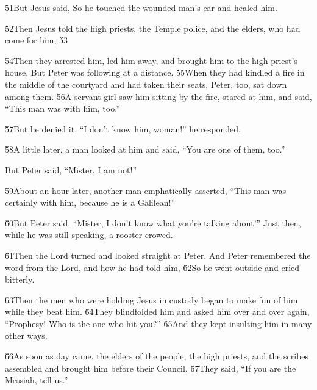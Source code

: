 \v{51}But Jesus said,  So he touched the wounded man's ear and healed him.

\v{52}Then Jesus told the high priests, the Temple police, and the elders, who had come for him,  \v{53}

\v{54}Then they arrested him, led him away, and brought him to the high priest's house. But Peter was following at a distance. \v{55}When they had kindled a fire in the middle of the courtyard and had taken their seats, Peter, too, sat down among them. \v{56}A servant girl saw him sitting by the fire, stared at him, and said, ``This man was with him, too.''

\v{57}But he denied it, ``I don't know him, woman!'' he responded.

\v{58}A little later, a man looked at him and said, ``You are one of them, too.''

But Peter said, ``Mister, I am not!''

\v{59}About an hour later, another man emphatically asserted, ``This man was certainly with him, because he is a Galilean!''

\v{60}But Peter said, ``Mister, I don't know what you're talking about!'' Just then, while he was still speaking, a rooster crowed.

\v{61}Then the Lord turned and looked straight at Peter. And Peter remembered the word from the Lord, and how he had told him,  \v{62}So he went outside and cried bitterly.

\v{63}Then the men who were holding Jesus in custody began to make fun of him while they beat him. \v{64}They blindfolded him and asked him over and over again, ``Prophesy! Who is the one who hit you?'' \v{65}And they kept insulting him in many other ways.

\v{66}As soon as day came, the elders of the people, the high priests, and the scribes assembled and brought him before their Council. \v{67}They said, ``If you are the Messiah, tell us.''

